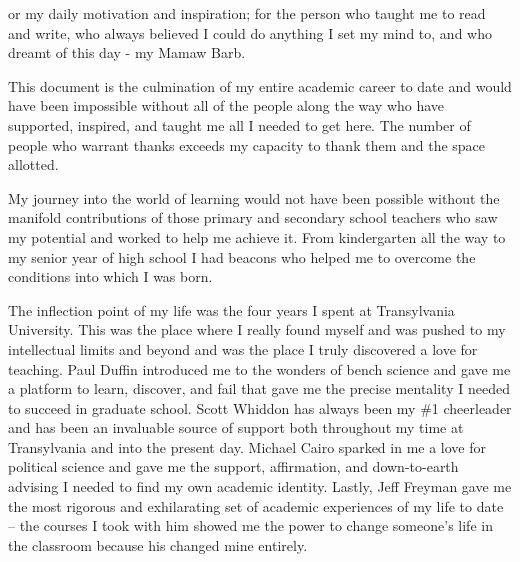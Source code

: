\documentclass[PhD]{dukethesis2006}
\begin{document}
\begin{doublespace}
\dedication

For my daily motivation and inspiration; for the person who taught me to read and write, who always believed I could do anything I set my mind to, and who dreamt of this day - my Mamaw Barb.

\end{doublespace}

\listoftables

\listoffigures

\acknowledgements

\begin{doublespace}

This document is the culmination of my entire academic career to date and would have been impossible without all of the people along the way who have supported, inspired, and taught me all I needed to get here. The number of people who warrant thanks exceeds my capacity to thank them and the space allotted. 

My journey into the world of learning would not have been possible without the manifold contributions of those primary and secondary school teachers who saw my potential and worked to help me achieve it. From kindergarten all the way to my senior year of high school I had beacons who helped me to overcome the conditions into which I was born. 

The inflection point of my life was the four years I spent at Transylvania University. This was the place where I really found myself and was pushed to my intellectual limits and beyond and was the place I truly discovered a love for teaching. Paul Duffin introduced me to the wonders of bench science and gave me a platform to learn, discover, and fail that gave me the precise mentality I needed to succeed in graduate school. Scott Whiddon has always been my \#1 cheerleader and has been an invaluable source of support both throughout my time at Transylvania and into the present day. Michael Cairo sparked in me a love for political science and gave me the support, affirmation, and down-to-earth advising I needed to find my own academic identity. Lastly, Jeff Freyman gave me the most rigorous and exhilarating set of academic experiences of my life to date -- the courses I took with him showed me the power to change someone's life in the classroom because his changed mine entirely.


\end{doublespace}
\end{document}
